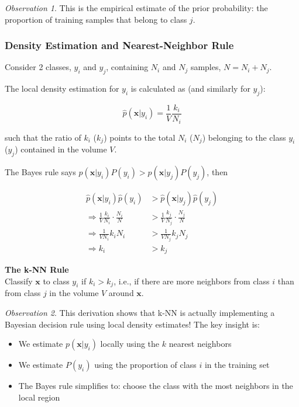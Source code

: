 \documentclass[11pt,a4paper]{article}
\theoremstyle{definition}
\theoremstyle{plain}
\theoremstyle{remark}
\newtheorem*{observation}{Observation}
\begin{document}
\begin{observation}
This is the empirical estimate of the prior probability: the proportion of training samples that belong to class $j$.
\end{observation}

\subsubsection{Density Estimation and Nearest-Neighbor Rule}

Consider 2 classes, $y_i$ and $y_j$, containing $N_i$ and $N_j$ samples, $N = N_i + N_j$.

The local density estimation for $y_i$ is calculated as (and similarly for $y_j$):

\[
\hat{p}(\mathbf{x}|y_i) = \frac{1}{V} \frac{k_i}{N_i}
\]

such that the ratio of $k_i$ ($k_j$) points to the total $N_i$ ($N_j$) belonging to the class $y_i$ ($y_j$) contained in the volume $V$.

\begin{tcolorbox}[colback=blue!5!white,colframe=blue!75!black,title=\textbf{Deriving k-NN from Bayes Rule}]
The Bayes rule says $p(\mathbf{x}|y_i)P(y_i) > p(\mathbf{x}|y_j)P(y_j)$, then

\begin{align*}
\hat{p}(\mathbf{x}|y_i)\hat{p}(y_i) &> \hat{p}(\mathbf{x}|y_j)\hat{p}(y_j) \\
\Rightarrow \frac{1}{V} \frac{k_i}{N_i} \cdot \frac{N_i}{N} &> \frac{1}{V} \frac{k_j}{N_j} \cdot \frac{N_j}{N} \\
\Rightarrow \frac{1}{V N_i} k_i N_i &> \frac{1}{V N_j} k_j N_j \\
\Rightarrow k_i &> k_j
\end{align*}
\end{tcolorbox}

\begin{center}
\colorbox{purple!15}{\parbox{0.9\textwidth}{
\textbf{The k-NN Rule}\\[0.2cm]
Classify $\mathbf{x}$ to class $y_i$ if $k_i > k_j$, i.e., if there are more neighbors from class $i$ than from class $j$ in the volume $V$ around $\mathbf{x}$.
}}
\end{center}

\begin{observation}
This derivation shows that k-NN is actually implementing a Bayesian decision rule using local density estimates! The key insight is:
\begin{itemize}
    \item We estimate $p(\mathbf{x}|y_i)$ locally using the $k$ nearest neighbors
    \item We estimate $P(y_i)$ using the proportion of class $i$ in the training set
    \item The Bayes rule simplifies to: choose the class with the most neighbors in the local region
\end{itemize}
\end{observation}
\end{document}

